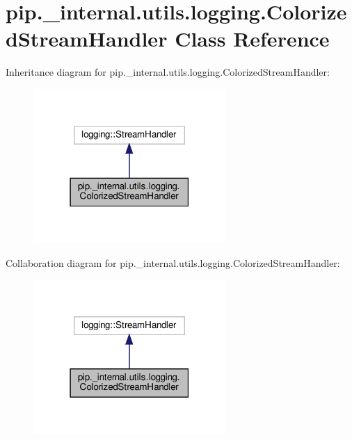 \hypertarget{classpip_1_1__internal_1_1utils_1_1logging_1_1ColorizedStreamHandler}{}\section{pip.\+\_\+internal.\+utils.\+logging.\+Colorized\+Stream\+Handler Class Reference}
\label{classpip_1_1__internal_1_1utils_1_1logging_1_1ColorizedStreamHandler}


Inheritance diagram for pip.\+\_\+internal.\+utils.\+logging.\+Colorized\+Stream\+Handler\+:
\nopagebreak
\begin{figure}[H]
\begin{center}
\leavevmode
\includegraphics[width=207pt]{classpip_1_1__internal_1_1utils_1_1logging_1_1ColorizedStreamHandler__inherit__graph}
\end{center}
\end{figure}


Collaboration diagram for pip.\+\_\+internal.\+utils.\+logging.\+Colorized\+Stream\+Handler\+:
\nopagebreak
\begin{figure}[H]
\begin{center}
\leavevmode
\includegraphics[width=207pt]{classpip_1_1__internal_1_1utils_1_1logging_1_1ColorizedStreamHandler__coll__graph}
\end{center}
\end{figure}
